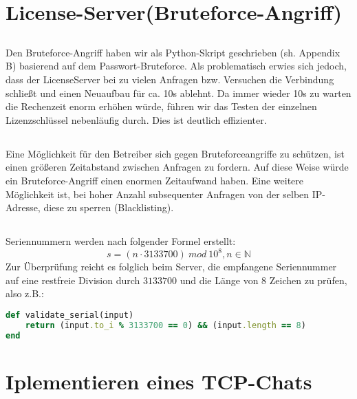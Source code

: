 \documentclass{scrartcl}
\begin{document}
  \section{License-Server(Bruteforce-Angriff)}
  \label{sec:License-Server(Bruteforce-Angriff)}
    \subsection{}
    \label{sub:4.1}
      Den Bruteforce-Angriff haben wir als Python-Skript geschrieben (sh.
      Appendix B) basierend auf dem Passwort-Bruteforce. Als problematisch
      erwies sich jedoch, dass der LicenseServer bei zu vielen Anfragen bzw.
      Versuchen die Verbindung schließt und einen Neuaufbau für ca. 10s
      ablehnt. Da immer wieder 10s zu warten die Rechenzeit enorm erhöhen
      würde, führen wir das Testen der einzelnen Lizenzschlüssel nebenläufig
      durch. Dies ist deutlich effizienter.
    \subsection{}
    \label{sub:4.2}
      Eine Möglichkeit für den Betreiber sich gegen Bruteforceangriffe zu
      schützen, ist einen größeren Zeitabstand zwischen Anfragen zu fordern.
      Auf diese Weise würde ein Bruteforce-Angriff einen enormen Zeitaufwand
      haben. Eine weitere Möglichkeit ist, bei hoher Anzahl subsequenter
      Anfragen von der selben IP-Adresse, diese zu sperren (Blacklisting).
    \subsection{}
    \label{sub:4.3}
      Seriennummern werden nach folgender Formel erstellt:
      \[
        s = (n \cdot 3133700)~mod~10^8, n \in \mathbb{N}
      \]
      Zur Überprüfung reicht es folglich beim Server, die empfangene Seriennummer
      auf eine restfreie Division durch $3133700$ und die Länge von 8 Zeichen
      zu prüfen, also z.B.:
      \begin{lstlisting}[language=ruby]
def validate_serial(input)
    return (input.to_i % 3133700 == 0) && (input.length == 8)
end
      \end{lstlisting}

  \section{Iplementieren eines TCP-Chats}
  \label{sec:Iplementieren eines TCP-Chats}
\end{document}
